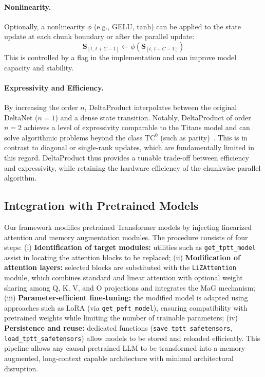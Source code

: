 \documentclass[10pt,a4paper]{article}
\begin{document}
\paragraph{Nonlinearity.}

Optionally, a nonlinearity $\phi$ (e.g., GELU, tanh) can be applied to the state update at each chunk boundary or after the parallel update:
\begin{equation}
    \mathbf{S}_{[t,\,t+C-1]} \leftarrow \phi(\mathbf{S}_{[t,\,t+C-1]})
\end{equation}
This is controlled by a flag in the implementation and can improve model capacity and stability.

\paragraph{Expressivity and Efficiency.}

By increasing the order $n$, DeltaProduct interpolates between the original DeltaNet ($n=1$) and a dense state transition. Notably, DeltaProduct of order $n=2$ achieves a level of expressivity comparable to the Titans model and can solve algorithmic problems beyond the class $\mathrm{TC}^0$ (such as parity)~\cite{siems2025deltaproduct, merrill2024illusion}. This is in contrast to diagonal or single-rank updates, which are fundamentally limited in this regard. DeltaProduct thus provides a tunable trade-off between efficiency and expressivity, while retaining the hardware efficiency of the chunkwise parallel algorithm.


\subsection{Integration with Pretrained Models}

Our framework modifies pretrained Transformer models by injecting linearized attention and memory augmentation modules. The procedure consists of four steps: (i) \textbf{Identification of target modules:} utilities such as \texttt{get\_tptt\_model} assist in locating the attention blocks to be replaced; (ii) \textbf{Modification of attention layers:} selected blocks are substituted with the \texttt{LiZAttention} module, which combines standard and linear attention with optional weight sharing among Q, K, V, and O projections and integrates the MaG mechanism; (iii) \textbf{Parameter-efficient fine-tuning:} the modified model is adapted using approaches such as LoRA (via \texttt{get\_peft\_model}), ensuring compatibility with pretrained weights while limiting the number of trainable parameters; (iv) \textbf{Persistence and reuse:} dedicated functions (\texttt{save\_tptt\_safetensors}, \texttt{load\_tptt\_safetensors}) allow models to be stored and reloaded efficiently. This pipeline allows any causal pretrained LLM to be transformed into a memory-augmented, long-context capable architecture with minimal architectural disruption.
\end{document}
